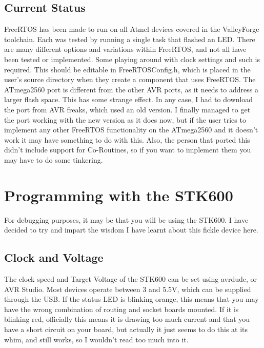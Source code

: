 \documentclass[a4paper, oneside, 11pt, titlepage, onecolumn, openright]{report}
\begin{document}
{{			
\section{Current Status}
			\label{s:FreeRTOSCurrentStatus}
			FreeRTOS has been made to run on all Atmel devices covered in the ValleyForge toolchain. Each was tested by running a single task that flashed an LED. There are many different options and variations within FreeRTOS, and not all have been tested or implemented. \newline
			Some playing around with clock settings and such is required. This should be editable in FreeRTOSConfig.h, which is placed in the user's source directory when they create a component that uses FreeRTOS.\newline
			The ATmega2560 port is different from the other AVR ports, as it needs to address a larger flash space. This has some strange effect. In any case, I had to download the port from AVR freaks, which used an old version. I finally managed to get the port working with the new version as it does now, but if the user tries to implement any other FreeRTOS functionality on the ATmega2560 and it doesn't work it may have something to do with this. Also, the person that ported this didn't include support for Co-Routines, so if you want to implement them you may have to do some tinkering.
			
			
\chapter{Programming with the STK600}
			\label{C:STK600}
			For debugging purposes, it may be that you will be using the STK600. I have decided to try and impart the wisdom I have learnt about this fickle device here.
			
\section{Clock and Voltage}
			\label{STK600ClockVoltage}
			The clock speed and Target Voltage of the STK600 can be set using avrdude, or AVR Studio. Most devices operate between 3 and 5.5V, which can be supplied through the USB.\newline
			If the status LED is blinking orange, this means that you may have the wrong combination of routing and socket boards mounted. If it is blinking red, officially this means it is drawing too much current and that you have a short circuit on your board, but actually it just seems to do this at its whim, and still works, so I wouldn't read too much into it.			
			
}}
\end{document}
